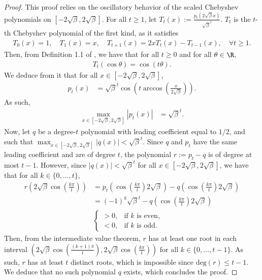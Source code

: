 \documentclass{article}
\theoremstyle{plain}
\theoremstyle{definition}
\theoremstyle{remark}
\begin{document}
\begin{proof}
  This proof relies on the oscillatory behavior of the scaled Chebyshev polynomials on $[-2\sqrt{\beta},2\sqrt{\beta}]$. For all $t\geqslant 1$, let $T_t(x) := \frac{p_t(2\sqrt{\beta}x)}{\sqrt{\beta}^t}$. $T_t$ is the $t$-th Chebyshev polynomial of the first kind, as it satisfies
  \begin{align*}
    T_0(x) = 1, \quad T_1(x) = x, \quad T_{t+1}(x) = 2x T_t(x) - T_{t-1}(x), \quad \forall t\geqslant 1.
  \end{align*}
  Then, from Definition 1.1 of \cite{mason2002chebyshev}, we have that for all $t \geqslant 0$ and for all $\theta \in \R$,
  \begin{align*}
    T_t(\cos \theta) = \cos(t\theta).
  \end{align*}
  We deduce from it that for all $x \in [-2\sqrt{\beta}, 2\sqrt{\beta}]$,
  \begin{align*}
    p_t(x) & = \sqrt{\beta}^t \cos\left(t \arccos\left(\frac{x}{2\sqrt{\beta}}\right)\right).
  \end{align*}
  As such, 
  \begin{align*}
    \max_{x \in [-2\sqrt{\beta}, 2\sqrt{\beta}]} |p_t(x)| & = \sqrt{\beta}^t.
  \end{align*}
  Now, let $q$ be a degree-$t$ polynomial with leading coefficient equal to $1/2$, and such that $\max_{x \in [-2\sqrt{\beta}, 2\sqrt{\beta}]} |q(x)| < \sqrt{\beta}^t$. Since $q$ and $p_t$ have the same leading coefficient and are of degree $t$, the polynomial $r := p_t -q$ is of degree at most $t-1$. However, since $|q(x)| < \sqrt{\beta}^t$ for all $x \in [-2\sqrt{\beta}, 2\sqrt{\beta}]$, we have that for all $k \in \{0,\dots,t\}$,
  \begin{align*}
    r\left(2\sqrt{\beta}\cos\left(\frac{k\pi}{t}\right) \right) & = p_t\left(\cos\left(\frac{k\pi}{t}\right) 2\sqrt{\beta}\right) - q\left(\cos\left(\frac{k\pi}{t}\right) 2\sqrt{\beta}\right) \\
    & = (-1)^k \sqrt{\beta}^t - q\left(\cos\left(\frac{k\pi}{t}\right) 2\sqrt{\beta}\right) \\
    &  \begin{cases}
      > 0, & \text{if } k \text{ is even}, \\
      < 0, & \text{if } k \text{ is odd}.
    \end{cases}
  \end{align*}
  Then, from the intermediate value theorem, $r$ has at least one root in each interval $\left(2\sqrt{\beta}\cos\left(\frac{(k+1)\pi}{t}\right), 2\sqrt{\beta}\cos\left(\frac{k\pi}{t}\right)\right)$ for all $k \in \{0,\dots,t-1\}$. As such, $r$ has at least $t$ distinct roots, which is impossible since $\mathrm{deg}(r) \leqslant t-1$. We deduce that no such polynomial $q$ exists, which concludes the proof.

\end{proof}
\end{document}

